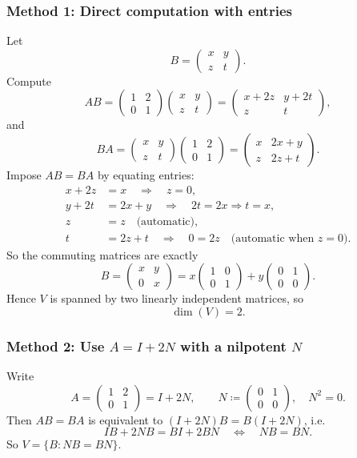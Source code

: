 \documentclass[12pt]{article}
\newcommand{\dimn}{\operatorname{dim}}
\begin{document}
\subsubsection{Method 1: Direct computation with entries}
Let
\[
B=
\begin{pmatrix}
x & y\\
z & t
\end{pmatrix}.
\]
Compute
\[
AB=
\begin{pmatrix}
1 & 2\\
0 & 1
\end{pmatrix}
\begin{pmatrix}
x & y\\
z & t
\end{pmatrix}
=
\begin{pmatrix}
x+2z & y+2t\\
z & t
\end{pmatrix},
\]
and
\[
BA=
\begin{pmatrix}
x & y\\
z & t
\end{pmatrix}
\begin{pmatrix}
1 & 2\\
0 & 1
\end{pmatrix}
=
\begin{pmatrix}
x & 2x+y\\
z & 2z+t
\end{pmatrix}.
\]
Impose \(AB=BA\) by equating entries:
\begin{align*}
x+2z &= x \quad\Rightarrow\quad z=0,\\
y+2t &= 2x+y \quad\Rightarrow\quad 2t=2x \Rightarrow t=x,\\
z &= z \quad\text{(automatic)},\\
t &= 2z+t \quad\Rightarrow\quad 0=2z \quad\text{(automatic when }z=0).
\end{align*}
So the commuting matrices are exactly
\[
B=
\begin{pmatrix}
x & y\\
0 & x
\end{pmatrix}
= x
\begin{pmatrix}
1&0\\0&1
\end{pmatrix}
+y
\begin{pmatrix}
0&1\\0&0
\end{pmatrix}.
\]
Hence \(V\) is spanned by two linearly independent matrices, so
\[
\boxed{\,\dimn(V)=2.\,}
\]

\newpage
\subsubsection{Method 2: Use \(A=I+2N\) with a nilpotent \(N\)}
Write
\[
A=
\begin{pmatrix}
1&2\\0&1
\end{pmatrix}
=
I+2N,
\qquad
N\coloneqq
\begin{pmatrix}
0&1\\0&0
\end{pmatrix},
\quad N^2=0.
\]
Then \(AB=BA\) is equivalent to \((I+2N)B=B(I+2N)\), i.e.
\[
IB+2NB = BI+2BN
\quad\Longleftrightarrow\quad
NB=BN.
\]
So \(V=\{B: NB=BN\}\).
\end{document}
